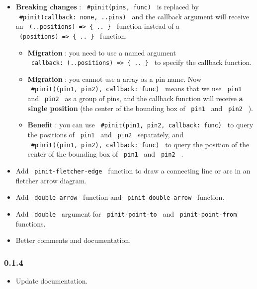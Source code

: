 \begin{itemize}
\tightlist
\item
  \textbf{Breaking changes} : \texttt{\ \#pinit(pins,\ func)\ } is
  replaced by \texttt{\ \#pinit(callback:\ none,\ ..pins)\ } and the
  callback argument will receive an
  \texttt{\ (..positions)\ =\textgreater{}\ \{\ ..\ \}\ } function
  instead of a \texttt{\ (positions)\ =\textgreater{}\ \{\ ..\ \}\ }
  function.

  \begin{itemize}
  \tightlist
  \item
    \textbf{Migration} : you need to use a named argument
    \texttt{\ callback:\ (..positions)\ =\textgreater{}\ \{\ ..\ \}\ }
    to specify the callback function.
  \item
    \textbf{Migration} : you cannot use a array as a pin name. Now
    \texttt{\ \#pinit((pin1,\ pin2),\ callback:\ func)\ } means that we
    use \texttt{\ pin1\ } and \texttt{\ pin2\ } as a group of pins, and
    the callback function will receive \textbf{a single position} (the
    center of the bounding box of \texttt{\ pin1\ } and
    \texttt{\ pin2\ } ).
  \item
    \textbf{Benefit} : you can use
    \texttt{\ \#pinit(pin1,\ pin2,\ callback:\ func)\ } to query the
    positions of \texttt{\ pin1\ } and \texttt{\ pin2\ } separately, and
    \texttt{\ \#pinit((pin1,\ pin2),\ callback:\ func)\ } to query the
    position of the center of the bounding box of \texttt{\ pin1\ } and
    \texttt{\ pin2\ } .
  \end{itemize}
\item
  Add \texttt{\ pinit-fletcher-edge\ } function to draw a connecting
  line or arc in an fletcher arrow diagram.
\item
  Add \texttt{\ double-arrow\ } function and
  \texttt{\ pinit-double-arrow\ } function.
\item
  Add \texttt{\ double\ } argument for \texttt{\ pinit-point-to\ } and
  \texttt{\ pinit-point-from\ } functions.
\item
  Better comments and documentation.
\end{itemize}

\subsubsection{0.1.4}\label{section-3}

\begin{itemize}
\tightlist
\item
  Update documentation.
\end{itemize}

